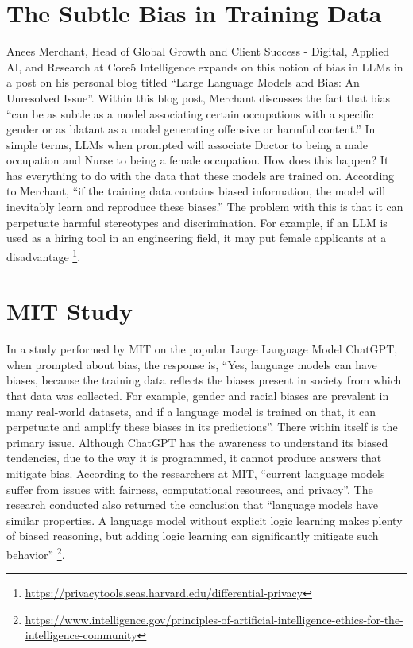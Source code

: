 \documentclass[
]{book}
\begin{document}
\hypertarget{the-subtle-bias-in-training-data}{%
\section{The Subtle Bias in Training Data}\label{the-subtle-bias-in-training-data}}

Anees Merchant, Head of Global Growth and Client Success - Digital, Applied AI, and Research at Core5 Intelligence expands on this notion of bias in LLMs in a post on his personal blog titled ``Large Language Models and Bias: An Unresolved Issue''. Within this blog post, Merchant discusses the fact that bias ``can be as subtle as a model associating certain occupations with a specific gender or as blatant as a model generating offensive or harmful content.'' In simple terms, LLMs when prompted will associate Doctor to being a male occupation and Nurse to being a female occupation. How does this happen? It has everything to do with the data that these models are trained on. According to Merchant, ``if the training data contains biased information, the model will inevitably learn and reproduce these biases.'' The problem with this is that it can perpetuate harmful stereotypes and discrimination. For example, if an LLM is used as a hiring tool in an engineering field, it may put female applicants at a disadvantage \footnote{\url{https://privacytools.seas.harvard.edu/differential-privacy}}.

\hypertarget{mit-study}{%
\section{MIT Study}\label{mit-study}}

In a study performed by MIT on the popular Large Language Model ChatGPT, when prompted about bias, the response is, ``Yes, language models can have biases, because the training data reflects the biases present in society from which that data was collected. For example, gender and racial biases are prevalent in many real-world datasets, and if a language model is trained on that, it can perpetuate and amplify these biases in its predictions''. There within itself is the primary issue. Although ChatGPT has the awareness to understand its biased tendencies, due to the way it is programmed, it cannot produce answers that mitigate bias. According to the researchers at MIT, ``current language models suffer from issues with fairness, computational resources, and privacy''. The research conducted also returned the conclusion that ``language models have similar properties. A language model without explicit logic learning makes plenty of biased reasoning, but adding logic learning can significantly mitigate such behavior'' \footnote{\url{https://www.intelligence.gov/principles-of-artificial-intelligence-ethics-for-the-intelligence-community}}.
\end{document}
